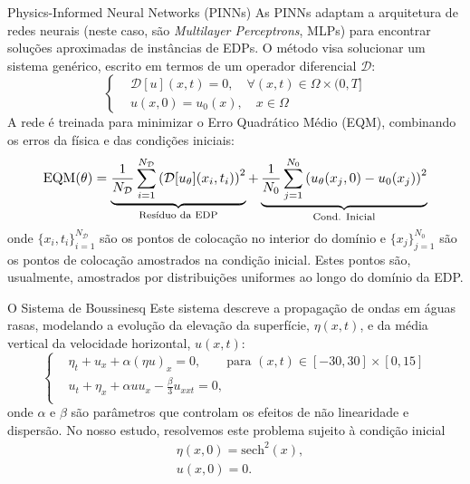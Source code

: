 \documentclass[final]{beamer}
\newlength{\colwidth}
\begin{document}
\begin{frame}[t]
\begin{columns}[t]
\begin{column}{\colwidth}
  \begin{block}{Physics-Informed Neural Networks (PINNs)}
    As PINNs adaptam a arquitetura de redes neurais (neste caso, são \textit{Multilayer Perceptrons}, MLPs) para encontrar soluções aproximadas de instâncias de EDPs. O método visa solucionar um sistema genérico, escrito em termos de um operador diferencial $\mathcal{D}$:
    \begin{equation*}
        \left\{
        \begin{aligned}
            & \mathcal{D}[u](x,t) = 0, \quad \forall (x,t) \in \Omega \times (0, T] \\
            & u(x,0) = u_0(x), \quad x \in \Omega
        \end{aligned}
        \right.
    \end{equation*}
    A rede é treinada para minimizar o Erro Quadrático Médio (EQM), combinando os erros da física e das condições iniciais:
    \begin{equation*}
    \resizebox{0.9\columnwidth}{!}{ $
    \text{EQM}(\theta) = \underbrace{\frac{1}{N_{\mathcal{D}}} \sum_{i=1}^{N_{\mathcal{D}}} \left( \mathcal{D}[u_\theta](x_i, t_i) \right)^2}_{\text{Resíduo da EDP}} +
                       \underbrace{\frac{1}{N_{0}} \sum_{j=1}^{N_{0}} \left( u_\theta(x_j, 0) - u_0(x_j) \right)^2}_{\text{Cond. Inicial}}
    $ }
    \end{equation*}
    onde $\{x_i, t_i\}_{i=1}^{N_{\mathcal{D}}}$ são os pontos de colocação no interior do domínio e $\{x_j\}_{j=1}^{N_0}$ são os pontos de colocação amostrados na condição inicial. Estes pontos são, usualmente, amostrados por distribuições uniformes ao longo do domínio da EDP.
  \end{block}
  \begin{block}{O Sistema de Boussinesq}
    Este sistema descreve a propagação de ondas em águas rasas, modelando a evolução da elevação da superfície, $\eta(x,t)$, e da média vertical da velocidade horizontal, $u(x,t)$: 
    \begin{equation*}
    \left\{
    \begin{aligned}
        & \eta_t + u_x + \alpha(\eta u)_x = 0, \qquad \text{para } (x,t) \in [-30, 30] \times [0, 15] \\
        & u_t + \eta_x + \alpha u u_x - \tfrac{\beta}{3} u_{xxt} = 0, \\
    \end{aligned}
    \right.
    \end{equation*}
    onde $\alpha$ e $\beta$ são parâmetros que controlam os efeitos de não linearidade e dispersão. No nosso estudo, resolvemos este problema sujeito à condição inicial
    \begin{equation*}
    \begin{aligned}
        & \eta(x, 0) = \text{sech}^2(x), \\
        & u(x, 0) = 0.
    \end{aligned}
    \end{equation*}


\end{block}
\end{column}
\end{columns}
\end{frame}
\end{document}
